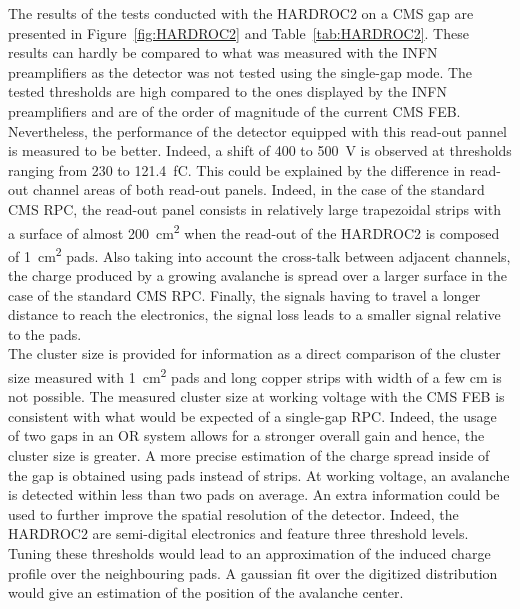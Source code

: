 	The results of the tests conducted with the HARDROC2 on a CMS gap are presented in Figure~\ref{fig:HARDROC2} and Table~\ref{tab:HARDROC2}. These results can hardly be compared to what was measured with the INFN preamplifiers as the detector was not tested using the single-gap mode. The tested thresholds are high compared to the ones displayed by the INFN preamplifiers and are of the order of magnitude of the current CMS FEB. Nevertheless, the performance of the detector equipped with this read-out pannel is measured to be better. Indeed, a shift of 400 to \SI{500}{V} is observed at thresholds ranging from 230 to \SI{121.4}{fC}. This could be explained by the difference in read-out channel areas of both read-out panels. Indeed, in the case of the standard CMS RPC, the read-out panel consists in relatively large trapezoidal strips with a surface of almost \SI{200}{cm^2} when the read-out of the HARDROC2 is composed of \SI{1}{cm^2} pads. Also taking into account the cross-talk between adjacent channels, the charge produced by a growing avalanche is spread over a larger surface in the case of the standard CMS RPC. Finally, the signals having to travel a longer distance to reach the electronics, the signal loss leads to a smaller signal relative to the pads.\\
	The cluster size is provided for information as a direct comparison of the cluster size measured with \SI{1}{cm^2} pads and long copper strips with width of a few \si{cm} is not possible. The measured cluster size at working voltage with the CMS FEB is consistent with what would be expected of a single-gap RPC. Indeed, the usage of two gaps in an OR system allows for a stronger overall gain and hence, the cluster size is greater. A more precise estimation of the charge spread inside of the gap is obtained using pads instead of strips. At working voltage, an avalanche is detected within less than two pads on average. An extra information could be used to further improve the spatial resolution of the detector. Indeed, the HARDROC2 are semi-digital electronics and feature three threshold levels. Tuning these thresholds would lead to an approximation of the induced charge profile over the neighbouring pads. A gaussian fit over the digitized distribution would give an estimation of the position of the avalanche center.
	
